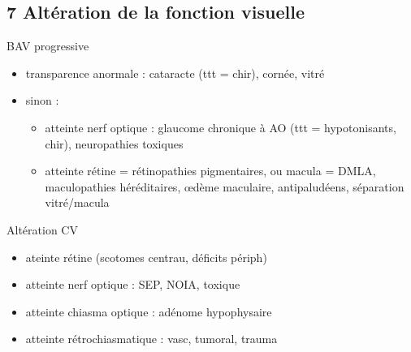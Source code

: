 \documentclass[11pt]{article}
\begin{document}
\begin{table}
\caption{Avec BAV, douloureux: étiologies}
\centering
{}
\label{org5b0c668}
\end{table}

\subsection{7 Altération de la fonction visuelle}
\label{sec:org31f5d3a}
BAV progressive
\begin{itemize}
\item transparence anormale : cataracte (ttt = chir), cornée, vitré
\item sinon : 
\begin{itemize}
\item atteinte nerf optique : glaucome chronique à AO (ttt = hypotonisants,
chir), neuropathies toxiques
\item atteinte rétine = rétinopathies pigmentaires, ou macula = DMLA,
maculopathies héréditaires, \oe{}dème maculaire, antipaludéens, séparation vitré/macula
\end{itemize}
\end{itemize}
Altération CV
\begin{itemize}
\item ateinte rétine (scotomes centrau, déficits périph)
\item atteinte nerf optique : SEP, NOIA, toxique
\item atteinte chiasma optique : adénome hypophysaire
\item atteinte rétrochiasmatique : vasc, tumoral, trauma
\end{itemize}
\end{document}
